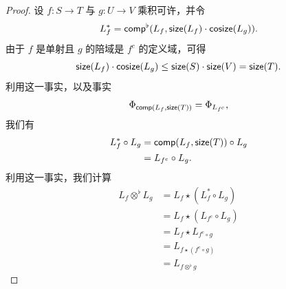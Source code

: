 \begin{proof} 设 $f:S \to T$ 与 $g:U \to V$ 乘积可许，并令
    \[
    L_f^* = \mathsf{comp}^\flat(L_f,\mathsf{size}(L_f)\cdot \mathsf{cosize}(L_g)).
    \]
    由于 $f$ 是单射且 $g$ 的陪域是 $f^c$ 的定义域，可得
    \[\mathsf{size}(L_f) \cdot \mathsf{cosize}(L_g) \leq \mathsf{size}(S) \cdot \mathsf{size}(V) = \mathsf{size}(T).\]
    利用这一事实，以及事实
    \[\Phi_{\mathsf{comp}(L_f,\mathsf{size}(T))} = \Phi_{L_{f^c}},\]
    我们有
    \begin{align*}
    L_f^* \circ L_g & = \mathsf{comp}(L_f,\mathsf{size}(T)) \circ L_g\\
    & = L_{f^c} \circ L_g.
    \end{align*}
    利用这一事实，我们计算
    \begin{align*}
        L_f \otimes^\flat L_g & = L_f \star (L_f^* \circ L_g)\\
        & = L_f \star (L_{f^c} \circ L_g)\\
        & = L_f \star L_{f^c \circ g}\\
        & = L_{f \star (f^c \circ g)}\\
        & = L_{f \otimes^\flat g}
    \end{align*}
\end{proof}


\newpage








\newpage
